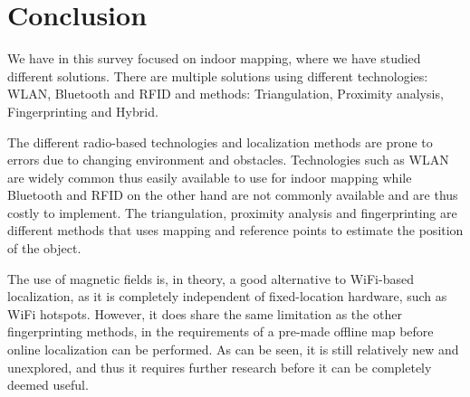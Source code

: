 \section{Conclusion}
We have in this survey focused on indoor mapping, where we have studied different solutions.
There are multiple solutions using different technologies: WLAN, Bluetooth and RFID and methods: Triangulation, Proximity analysis, Fingerprinting and Hybrid.

The different radio-based technologies and localization methods are prone to errors due to changing environment and obstacles.
Technologies such as WLAN are widely common thus easily available to use for indoor mapping while Bluetooth and RFID on the other hand are not commonly available and are thus costly to implement.
The triangulation, proximity analysis and fingerprinting are different methods that uses mapping and reference points to estimate the position of the object.

The use of magnetic fields is, in theory, a good alternative to WiFi-based localization, as it is completely independent of fixed-location hardware, such as WiFi hotspots.
However, it does share the same limitation as the other fingerprinting methods, in the requirements of a pre-made offline map before online localization can be performed.
As can be seen, it is still relatively new and unexplored, and thus it requires further research before it can be completely deemed useful.
